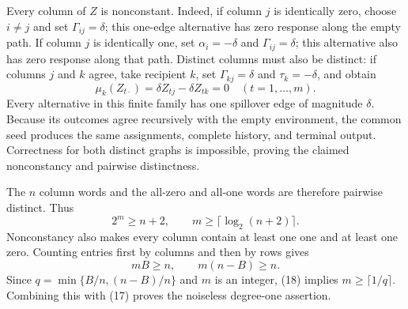 Every column of \(Z\) is nonconstant.  Indeed, if column \(j\) is identically zero, choose \(i\ne j\) and set \(\Gamma_{ij}=\delta\); this one-edge alternative has zero response along the empty path.  If column \(j\) is identically one, set \(\alpha_i=-\delta\) and \(\Gamma_{ij}=\delta\); this alternative also has zero response along that path.  Distinct columns must also be distinct: if columns \(j\) and \(k\) agree, take recipient \(k\), set \(\Gamma_{kj}=\delta\) and \(\tau_k=-\delta\), and obtain
\[
 \mu_k(Z_{t\cdot})=\delta Z_{tj}-\delta Z_{tk}=0
 \quad(t=1,\ldots,m). \tag{16}
\]
Every alternative in this finite family has one spillover edge of magnitude \(\delta\).  Because its outcomes agree recursively with the empty environment, the common seed produces the same assignments, complete history, and terminal output.  Correctness for both distinct graphs is impossible, proving the claimed nonconstancy and pairwise distinctness.

The \(n\) column words and the all-zero and all-one words are therefore pairwise distinct.  Thus
\[
 2^m\ge n+2,
 \qquad m\ge\lceil\log_2(n+2)\rceil. \tag{17}
\]
Nonconstancy also makes every column contain at least one one and at least one zero.  Counting entries first by columns and then by rows gives
\[
 mB\ge n,
 \qquad m(n-B)\ge n. \tag{18}
\]
Since \(q=\min\{B/n,(n-B)/n\}\) and \(m\) is an integer, (18) implies \(m\ge\lceil1/q\rceil\).  Combining this with (17) proves the noiseless degree-one assertion.